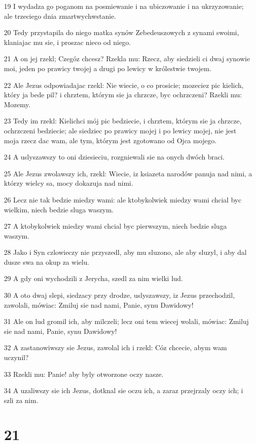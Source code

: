 \par 19 I wydadza go poganom na posmiewanie i na ubiczowanie i na ukrzyzowanie; ale trzeciego dnia zmartwychwstanie.
\par 20 Tedy przystapila do niego matka synów Zebedeuszowych z synami swoimi, klaniajac mu sie, i proszac nieco od niego.
\par 21 A on jej rzekl; Czegóz chcesz? Rzekla mu: Rzecz, aby siedzieli ci dwaj synowie moi, jeden po prawicy twojej a drugi po lewicy w królestwie twojem.
\par 22 Ale Jezus odpowiadajac rzekl: Nie wiecie, o co prosicie; mozeciez pic kielich, który ja bede pil? i chrztem, którym sie ja chrzcze, byc ochrzczeni? Rzekli mu: Mozemy.
\par 23 Tedy im rzekl: Kielichci mój pic bedziecie, i chrztem, którym sie ja chrzcze, ochrzczeni bedziecie; ale siedziec po prawicy mojej i po lewicy mojej, nie jest moja rzecz dac wam, ale tym, którym jest zgotowano od Ojca mojego.
\par 24 A uslyszawszy to oni dziesieciu, rozgniewali sie na onych dwóch braci.
\par 25 Ale Jezus zwolawszy ich, rzekl: Wiecie, iz ksiazeta narodów panuja nad nimi, a którzy wielcy sa, mocy dokazuja nad nimi.
\par 26 Lecz nie tak bedzie miedzy wami: ale ktobykolwiek miedzy wami chcial byc wielkim, niech bedzie sluga waszym.
\par 27 A ktobykolwiek miedzy wami chcial byc pierwszym, niech bedzie sluga waszym.
\par 28 Jako i Syn czlowieczy nie przyszedl, aby mu sluzono, ale aby sluzyl, i aby dal dusze swa na okup za wielu.
\par 29 A gdy oni wychodzili z Jerycha, szedl za nim wielki lud.
\par 30 A oto dwaj slepi, siedzacy przy drodze, uslyszawszy, iz Jezus przechodzil, zawolali, mówiac: Zmiluj sie nad nami, Panie, synu Dawidowy!
\par 31 Ale on lud gromil ich, aby milczeli; lecz oni tem wiecej wolali, mówiac: Zmiluj sie nad nami, Panie, synu Dawidowy!
\par 32 A zastanowiwszy sie Jezus, zawolal ich i rzekl: Cóz chcecie, abym wam uczynil?
\par 33 Rzekli mu: Panie! aby byly otworzone oczy nasze.
\par 34 A uzaliwszy sie ich Jezus, dotknal sie oczu ich, a zaraz przejrzaly oczy ich; i szli za nim.

\chapter{21}

